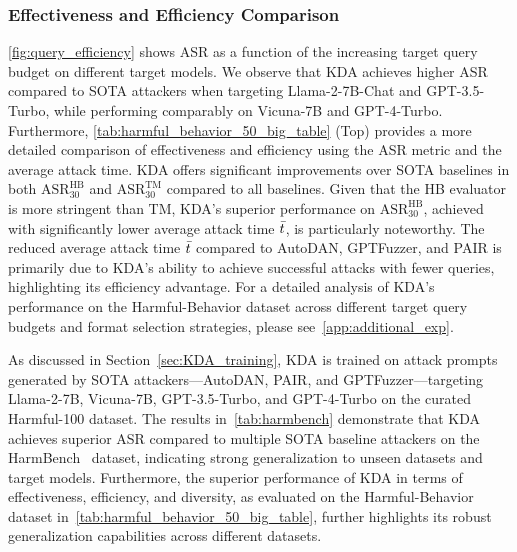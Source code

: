 \subsubsection{Effectiveness and Efficiency Comparison} \autoref{fig:query_efficiency} shows ASR as a function of the increasing target query budget on different target models. We observe that KDA achieves higher ASR compared to SOTA attackers when targeting Llama-2-7B-Chat and GPT-3.5-Turbo, while performing comparably on Vicuna-7B and GPT-4-Turbo. Furthermore, \autoref{tab:harmful_behavior_50_big_table} (Top) provides a more detailed comparison of effectiveness and efficiency using the ASR metric and the average attack time. KDA offers significant improvements over SOTA baselines in both $\text{ASR}^{\text{HB}}_{30}$ and $\text{ASR}^{\text{TM}}_{30}$ compared to all baselines. Given that the HB evaluator is more stringent than TM, KDA's superior performance on $\text{ASR}^{\text{HB}}_{30}$, achieved with significantly lower average attack time $\Bar{t}$, is particularly noteworthy. The reduced average attack time $\Bar{t}$ compared to AutoDAN, GPTFuzzer, and PAIR is primarily due to KDA's ability to achieve successful attacks with fewer queries, highlighting its efficiency advantage. For a detailed analysis of KDA's performance on the Harmful-Behavior dataset across different target query budgets and format selection strategies, please see~\autoref{app:additional_exp}. 


 As discussed in Section~\ref{sec:KDA_training}, KDA is trained on attack prompts generated by SOTA attackers—AutoDAN, PAIR, and GPTFuzzer—targeting Llama-2-7B, Vicuna-7B, GPT-3.5-Turbo, and GPT-4-Turbo on the curated Harmful-100 dataset. The results in~\autoref{tab:harmbench} demonstrate that KDA achieves superior ASR compared to multiple SOTA baseline attackers on the HarmBench~\citep{mazeika_harmbench_2024} dataset, indicating strong generalization to unseen datasets and target models. Furthermore, the superior performance of KDA in terms of effectiveness, efficiency, and diversity, as evaluated on the Harmful-Behavior~\citep{chao_jailbreaking_2024} dataset in~\autoref{tab:harmful_behavior_50_big_table}, further highlights its robust generalization capabilities across different datasets.


